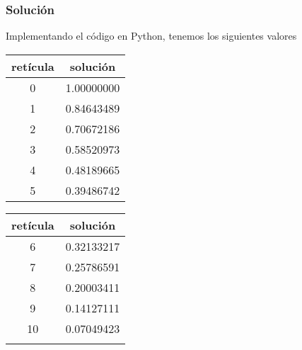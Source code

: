 \begin{frame}
\frametitle{Soluci\'{o}n}
Implementando el c\'{o}digo en Python, tenemos los siguientes valores
\\
\medskip
\begin{minipage}{4cm}
\begin{tabular}{c | c}
ret\'{i}cula & soluci\'{o}n \\ \hline
0 & 1.00000000 \\
1 & 0.84643489 \\
2 & 0.70672186 \\
3 & 0.58520973 \\
4 & 0.48189665 \\
5 & 0.39486742 \\
\end{tabular}
\end{minipage}
\hspace{0.5cm}
\begin{minipage}{4cm}
\begin{tabular}{c | c}
ret\'{i}cula & soluci\'{o}n \\ \hline
6 & 0.32133217 \\
7 & 0.25786591 \\
8 & 0.20003411 \\
9 & 0.14127111 \\
10 & 0.07049423 \\
 & 
\end{tabular}
\end{minipage}
\end{frame}